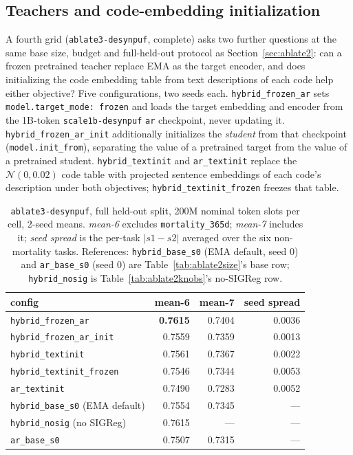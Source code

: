 \documentclass[11pt,a4paper]{article}
\newcommand{\code}[1]{\texttt{\small #1}}
\newcommand{\best}[1]{\textbf{#1}}
\begin{document}
\subsection{Teachers and code-embedding initialization}
\label{sec:ablate3}

A fourth grid (\code{ablate3-desynpuf}, complete) asks two further questions
at the same base size, budget and full-held-out protocol as
Section~\ref{sec:ablate2}: can a frozen pretrained teacher replace EMA as the
target encoder, and does initializing the code embedding table from text
descriptions of each code help either objective? Five configurations, two
seeds each. \code{hybrid\_frozen\_ar} sets \code{model.target\_mode: frozen}
and loads the target embedding and encoder from the 1B-token
\code{scale1b-desynpuf} \code{ar} checkpoint, never updating it.
\code{hybrid\_frozen\_ar\_init} additionally initializes the \emph{student}
from that checkpoint (\code{model.init\_from}), separating the value of a
pretrained target from the value of a pretrained student.
\code{hybrid\_textinit} and \code{ar\_textinit} replace the $\mathcal{N}(0,
0.02)$ code table with projected sentence embeddings of each code's
description under both objectives; \code{hybrid\_textinit\_frozen} freezes
that table.

\begin{table}[t]
\centering\footnotesize
\caption{\code{ablate3-desynpuf}, full held-out split, 200M nominal token
slots per cell, 2-seed means. \emph{mean-6} excludes
\code{mortality\_365d}; \emph{mean-7} includes it; \emph{seed spread} is the
per-task $|s1-s2|$ averaged over the six non-mortality tasks. References:
\code{hybrid\_base\_s0} (EMA default, seed 0) and \code{ar\_base\_s0} (seed
0) are Table~\ref{tab:ablate2size}'s base row; \code{hybrid\_nosig} is
Table~\ref{tab:ablate2knobs}'s no-SIGReg row.}
\label{tab:ablate3}
\begin{tabular}{lrrr}
\toprule
config & mean-6 & mean-7 & seed spread \\
\midrule
\code{hybrid\_frozen\_ar} & \best{0.7615} & 0.7404 & 0.0036 \\
\code{hybrid\_frozen\_ar\_init} & 0.7559 & 0.7359 & 0.0013 \\
\code{hybrid\_textinit} & 0.7561 & 0.7367 & 0.0022 \\
\code{hybrid\_textinit\_frozen} & 0.7546 & 0.7344 & 0.0053 \\
\code{ar\_textinit} & 0.7490 & 0.7283 & 0.0052 \\
\midrule
\code{hybrid\_base\_s0} (EMA default) & 0.7554 & 0.7345 & --- \\
\code{hybrid\_nosig} (no SIGReg) & 0.7615 & --- & --- \\
\code{ar\_base\_s0} & 0.7507 & 0.7315 & --- \\
\bottomrule
\end{tabular}
\end{table}
\end{document}
